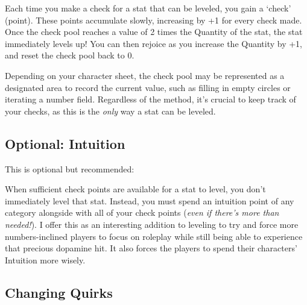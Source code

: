\documentclass[../main.tex]{subfiles}
\begin{document}
    Each time you make a check for a stat that can be leveled, you gain a `check' (point). These points accumulate slowly, increasing by +1 for every check made. Once the check pool reaches a value of 2 times the Quantity of the stat, the stat immediately levels up! You can then rejoice as you increase the Quantity by +1, and reset the check pool back to 0.

    Depending on your character sheet, the check pool may be represented as a designated area to record the current value, such as filling in empty circles or iterating a number field. Regardless of the method, it's crucial to keep track of your checks, as this is the \emph{only} way a stat can be leveled.

    \subsection{Optional: Intuition}
    
    This is optional but recommended:

    When sufficient check points are available for a stat to level, you don't immediately level that stat. Instead, you must spend an intuition point of any category alongside with all of your check points (\emph{even if there's more than needed!}). I offer this as an interesting addition to leveling to try and force more numbers-inclined players to focus on roleplay while still being able to experience that precious dopamine hit. It also forces the players to spend their characters' Intuition more wisely.

    \subsection{Changing Quirks}
\end{document}
